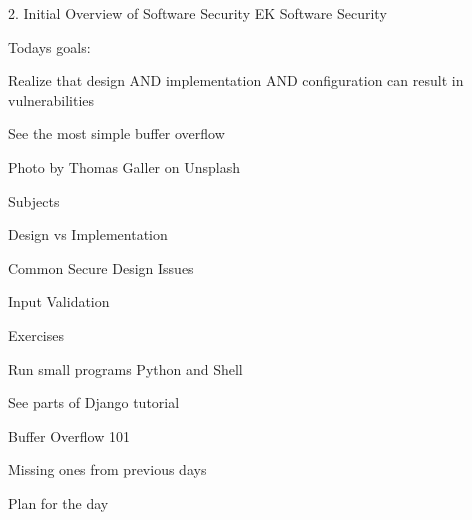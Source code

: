 \documentclass[Screen16to9,17pt]{foils}
\begin{document}
\mytitlepage
{2. Initial Overview of Software Security}
{EK  Software Security}



Todays goals:
\begin{list2}
\item Realize that design AND implementation AND configuration can result in vulnerabilities
\item See the most simple buffer overflow
\end{list2}

  Photo by Thomas Galler on Unsplash



\begin{list1}
\item Subjects
\begin{list2}
\item Design vs Implementation
\item Common  Secure Design Issues
\item Input Validation
\end{list2}
\item Exercises
\begin{list2}
\item Run small programs Python and Shell
\item See parts of Django tutorial
\item Buffer Overflow 101
\item Missing ones from previous days
\end{list2}
\end{list1}


Plan for the day
\end{document}
